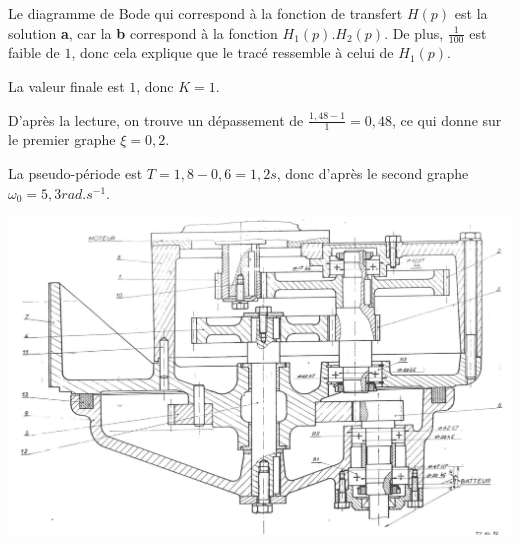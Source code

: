 \cor

Le diagramme de Bode qui correspond à la fonction de transfert $H(p)$ est la solution \textbf{a}, car la \textbf{b} correspond à la fonction $H_1(p).H_2(p)$. De plus, $\frac{1}{100}$ est faible de $1$, donc cela explique que le tracé ressemble à celui de $H_1(p)$.

\cor

La valeur finale est $1$, donc $K=1$.

D'après la lecture, on trouve un dépassement de $\frac{1,48-1}{1}=0,48$, ce qui donne sur le premier graphe $\xi=0,2$.

La pseudo-période est $T=1,8-0,6=1,2s$, donc d'après le second graphe $\omega_0=5,3rad.s^{-1}$.

\cor

\begin{center}
 \includegraphics[width=0.9\linewidth]{img/Malaxeur}
\end{center}



